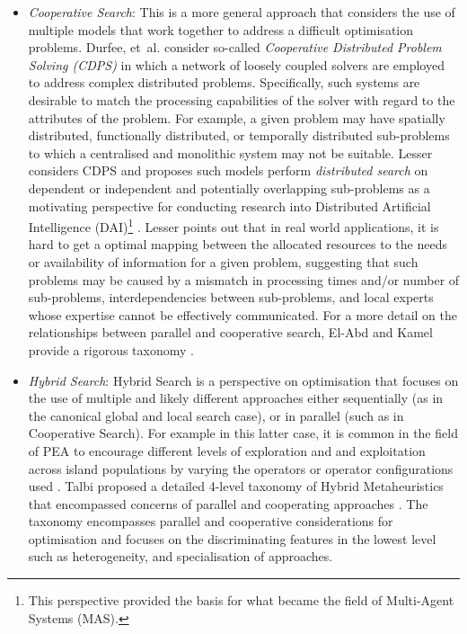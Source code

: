 \begin{itemize}
	\item \emph{Cooperative Search}: This is a more general approach that considers the use of multiple models that work together to address a difficult optimisation problems. Durfee, et~al. consider so-called \emph{Cooperative Distributed Problem Solving (CDPS)} in which a network of loosely coupled solvers are employed to address complex distributed problems. Specifically, such systems are desirable to match the processing capabilities of the solver with regard to the attributes of the problem. For example, a given problem may have spatially distributed, functionally distributed, or temporally distributed sub-problems to which a centralised and monolithic system may not be suitable. Lesser considers CDPS and proposes such models perform \emph{distributed search} on dependent or independent and potentially overlapping sub-problems as a motivating perspective for conducting research into Distributed Artificial Intelligence (DAI)\footnote{This perspective provided the basis for what became the field of Multi-Agent Systems (MAS).} \cite{Lesser1990}. Lesser points out that in real world applications, it is hard to get a optimal mapping between the allocated resources to the needs or availability of information for a given problem, suggesting that such problems may be caused by a mismatch in processing times and/or number of sub-problems, interdependencies between sub-problems, and local experts whose expertise cannot be effectively communicated. For a more detail on the relationships between parallel and cooperative search, El-Abd and Kamel provide a rigorous taxonomy \cite{El-Abd2005}.
	
	\item \emph{Hybrid Search}: Hybrid Search is a perspective on optimisation that focuses on the use of multiple and likely different approaches either sequentially (as in the canonical global and local search case), or in parallel (such as in Cooperative Search). For example in this latter case, it is common in the field of PEA to encourage different levels of exploration and and exploitation across island populations by varying the operators or operator configurations used \cite{Tanese1989, Adamidis1996}. Talbi proposed a detailed 4-level taxonomy of Hybrid Metaheuristics that encompassed concerns of parallel and cooperating approaches \cite{Talbi2001}. The taxonomy encompasses parallel and cooperative considerations for optimisation and focuses on the discriminating features in the lowest level such as heterogeneity, and specialisation of approaches.
	

\end{itemize}
